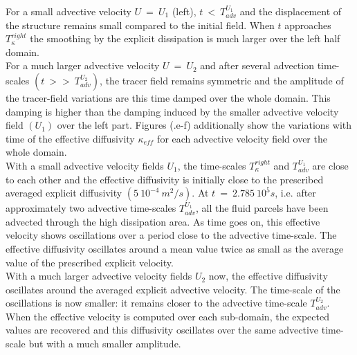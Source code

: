 For a small advective velocity $U\ =\ U_1$ (left), $t\ <\ T_{adv}^{U_1}$ and the displacement of the structure remains small compared to the initial field. When $t$ approaches $T_{\kappa}^{right}$ the smoothing by the explicit dissipation is much larger over the left half domain.\\ 
For a much larger advective velocity $U\ =\ U_2$ and after several advection time-scales $(t\ >>\ T_{adv}^{U_2})$, the tracer field remains symmetric
and the amplitude of the tracer-field variations are this time damped over the whole domain. This damping is higher than the damping induced by the smaller advective velocity field $(U_1)$ over the left part.
Figures (.e-f) additionally show the variations with time of the effective diffusivity $\kappa_{eff}$ for each advective velocity field over the whole domain. \\
With a small advective velocity fields $U_1$, the time-scales $T_{\kappa}^{right}$ and $T_{adv}^{U_1}$ are close to each other and the effective diffusivity is initially close to the prescribed averaged explicit diffusivity $(5 \ 10^{-4} \ m^2/s)$. At $t\ =\ 2.785\ 10^5 s$, i.e. after approximately two advective time-scales $T_{adv}^{U_1}$, all the fluid parcels have been advected through the high dissipation area.
As time goes on, this effective velocity shows oscillations over a period close to the advective time-scale. The effective diffusivity oscillates around a mean value twice as small as the average value of the prescribed explicit velocity. \\
With a much larger advective velocity fields $U_2$ now, the effective diffusivity oscillates around the averaged explicit advective velocity. The time-scale of the oscillations is now smaller: it remains closer to the advective time-scale $T_{adv}^{U_2}$.
When the effective velocity is computed over each sub-domain, the expected values are recovered and this diffusivity oscillates over the same advective time-scale but with a much smaller amplitude. 

